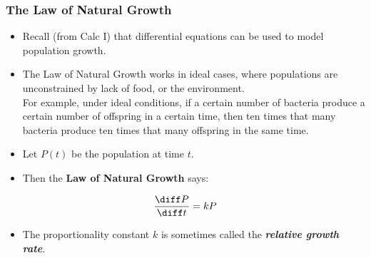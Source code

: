 \begin{frame}
\frametitle{The Law of Natural Growth}
\begin{itemize}
\item  Recall (from Calc I) that differential equations can be used to model population growth.
\item  The Law of Natural Growth works in ideal cases, where populations are unconstrained by lack of food, or the environment.\\
For example, under ideal conditions, if a certain number of bacteria produce a certain number of offspring in a certain time, then ten times that many bacteria produce ten times that many offspring in the same time.
\item  Let $P(t)$ be the population at time $t$.
\item  Then the \textbf{Law of Natural Growth} says:
\end{itemize}
\[
\frac{\diff P}{\diff t} = kP
\]

\begin{itemize}
\item  The proportionality constant $k$ is sometimes called the \textit{\textbf{relative growth rate}}.

\end{itemize}
\end{frame}
